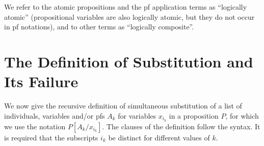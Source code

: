 \documentclass{article}
\begin{document}
We refer to the atomic propositions and the pf application terms as
``logically atomic'' (propositional variables are also logically
atomic, but they do not occur in pf notations), and to other terms as
``logically composite''.

\section{The Definition of Substitution and Its Failure}

We now give the recursive definition of simultaneous substitution of a
list of individuals, variables and/or pfs $A_k$ for variables
$x_{i_k}$ in a proposition $P$, for which we use the notation
$P[A_k/x_{i_k}]$.  The clauses of the definition follow the syntax.
It is required that the subscripts $i_k$ be distinct for different
values of $k$.
\end{document}
